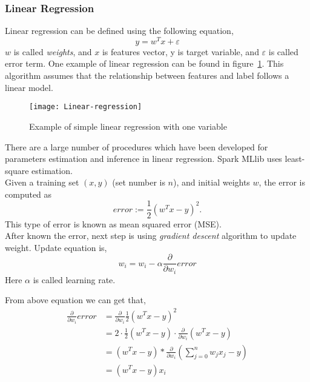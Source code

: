 \subsubsection{Linear Regression}
Linear regression can be defined using the following equation,
\begin{equation}
	y=w^Tx + \varepsilon
\end{equation}
$ w $ is called \emph{weights}, and $ x $ is features vector, y is target variable, and $ \varepsilon $ is called error term. One example of linear regression can be found in figure~\ref{fg:linear_regression}. This algorithm assumes that the relationship between features and label follows a linear model.
\begin{figure}[h]
	\centering
	\texttt{[image: Linear-regression]}
	\caption{Example of simple linear regression with one variable}
	\label{fg:linear_regression}
\end{figure}


There are a large number of procedures which have been developed for parameters estimation and inference in linear regression. Spark MLlib uses least-square estimation\cite{7_mllib_linear_methods}.\\


Given a training set $ (x, y) $ (set number is $ n $), and initial weights $ w $, the error is computed as
\begin{equation}
error := \frac{1}{2} (w^T x - y)^2.
\label{eq:error_equation}
\end{equation}
This type of error is known as mean squared error (MSE).\\


After known the error, next step is using \emph{gradient descent} algorithm to update weight. Update equation is,
\begin{equation}
w_i=w_i-\alpha \frac{\partial}{\partial w_i} error
\label{eq:update_equation}
\end{equation}
Here $ \alpha $ is called learning rate. 


From above equation we can get that,
\begin{equation}
\begin{split}
\frac{\partial }{\partial w_i} error & = \frac{\partial }{\partial w_i} \frac{1}{2}(w^Tx-y)^2\\
& = 2 \cdot \frac{1}{2} (w^Tx-y) \cdot \frac{\partial }{\partial w_i} (w^Tx-y)\\
& = (w^Tx-y) * \frac{\partial }{\partial w_i} (\sum_{j=0}^{n}w_j x_j - y)\\
& = (w^Tx-y)x_i
\end{split}
\label{eq:partil_error}
\end{equation}


